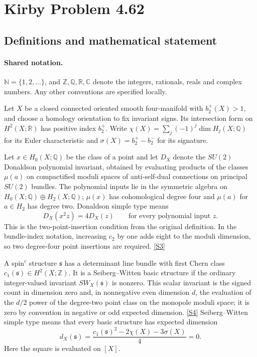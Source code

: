 \documentclass[11pt]{article}
\newcommand{\sref}[2]{\hyperlink{source:#1:#2}{[S#2]}}
\begin{document}
\section{Kirby Problem 4.62}\label{statement}

\subsection{Definitions and mathematical statement}

\paragraph{Shared notation.}$\mathbb N=\{1,2,\ldots\}$, and $\mathbb Z,\mathbb Q,\mathbb R,\mathbb C$ denote the integers, rationals, reals and complex numbers. Any other conventions are specified locally.


Let $X$ be a closed connected oriented smooth four-manifold with $b_2^+(X)>1$, and choose a homology orientation to fix invariant signs. Its intersection form on $H^2(X;\mathbb R)$ has positive index $b_2^+$. Write $\chi(X)=\sum_j(-1)^j\dim H_j(X;\mathbb Q)$ for its Euler characteristic and $\sigma(X)=b_2^+-b_2^-$ for its signature.

Let $x\in H_0(X;\mathbb Q)$ be the class of a point and let $D_X$ denote the $SU(2)$ Donaldson polynomial invariant, obtained by evaluating products of the classes $\mu(a)$ on compactified moduli spaces of anti-self-dual connections on principal $SU(2)$ bundles. The polynomial inputs lie in the symmetric algebra on $H_0(X;\mathbb Q)\oplus H_2(X;\mathbb Q)$; $\mu(x)$ has cohomological degree four and $\mu(a)$ for $a\in H_2$ has degree two. Donaldson simple type means
\[
D_X(x^2z)=4D_X(z)\qquad\text{for every polynomial input }z.
\]
This is the two-point-insertion condition from the original definition. In the bundle-index notation, increasing $c_2$ by one adds eight to the moduli dimension, so two degree-four point insertions are required. \sref{statement}{3}

A spin$^c$ structure $\mathfrak s$ has a determinant line bundle with first Chern class $c_1(\mathfrak s)\in H^2(X;\mathbb Z)$. It is a Seiberg--Witten basic structure if the ordinary integer-valued invariant $SW_X(\mathfrak s)$ is nonzero. This scalar invariant is the signed count in dimension zero and, in nonnegative even dimension $d$, the evaluation of the $d/2$ power of the degree-two point class on the monopole moduli space; it is zero by convention in negative or odd expected dimension. \sref{statement}{4} Seiberg--Witten simple type means that every basic structure has expected dimension
\[
d_X(\mathfrak s)=\frac{c_1(\mathfrak s)^2-2\chi(X)-3\sigma(X)}4=0.
\]
Here the square is evaluated on $[X]$.
\end{document}
